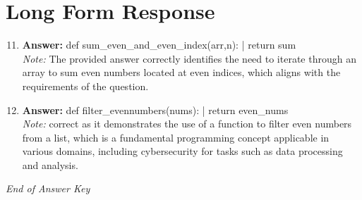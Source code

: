 \documentclass[12pt]{article}
\begin{document}
\section*{Long Form Response}
\begin{enumerate}[label=\arabic*.]
\setcounter{enumi}{10}
\item \textbf{Answer:} def sum\_even\_and\_even\_index(arr,n): | return sum
\\ \textit{Note:} The provided answer correctly identifies the need to iterate through an array to sum even numbers located at even indices, which aligns with the requirements of the question.
\item \textbf{Answer:} def filter\_evennumbers(nums): | return even\_nums
\\ \textit{Note:} correct as it demonstrates the use of a function to filter even numbers from a list, which is a fundamental programming concept applicable in various domains, including cybersecurity for tasks such as data processing and analysis.
\end{enumerate}

\vfill
\noindent\textit{End of Answer Key}
\end{document}
